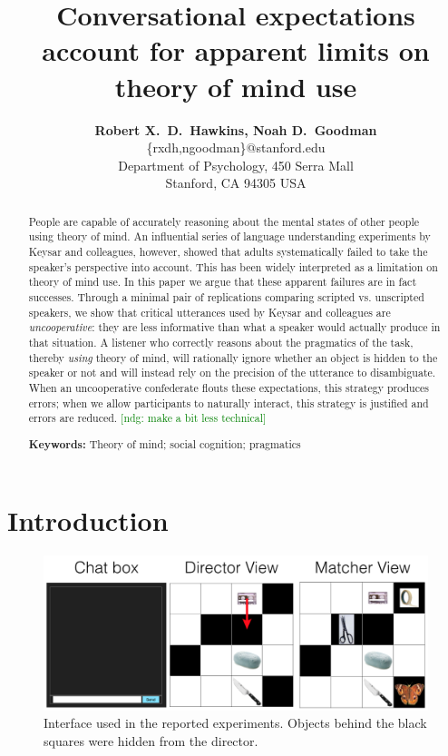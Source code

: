 \documentclass[10pt,letterpaper]{article}
\title{Conversational expectations account for apparent limits on theory of mind use}
\author{{\large \bf Robert X.~D.~Hawkins, Noah D.~Goodman}\\
  \{rxdh,ngoodman\}@stanford.edu\\
  Department of Psychology, 450 Serra Mall \\
  Stanford, CA 94305 USA}
\newcommand{\ndg}[1]{\textcolor{Green}{[ndg: #1]}}
\begin{document}
\maketitle

\begin{abstract}
People are capable of accurately reasoning about the mental states of other people using theory of mind. An influential series of language understanding experiments by Keysar and colleagues, however, showed that adults systematically failed to take the speaker's perspective into account. This has been widely interpreted as a limitation on theory of mind use. In this paper we argue that these apparent failures are in fact successes. Through a minimal pair of replications comparing scripted vs. unscripted speakers, we show that critical utterances used by Keysar and colleagues are \emph{uncooperative}: they are less informative than what a speaker would actually produce in that situation. A listener who correctly reasons about the pragmatics of the task, thereby \emph{using} theory of mind, will rationally ignore whether an object is hidden to the speaker or not and will instead rely on the precision of the utterance to disambiguate. When an uncooperative confederate flouts these expectations, this strategy produces errors; when we allow participants to naturally interact, this strategy is justified and errors are reduced.
\ndg{make a bit less technical}

\textbf{Keywords:} 
Theory of mind; social cognition; pragmatics
\end{abstract}

\section{Introduction}
\label{sec:intro}

\begin{figure}[bt!]
\begin{center}
\includegraphics[scale = .5]{images/overall_view.png}
\end{center}
\vspace{-.25cm}
\caption{Interface used in the reported experiments. Objects behind the black squares were hidden from the director.}
\label{fig:interface}
\end{figure}
\end{document}
